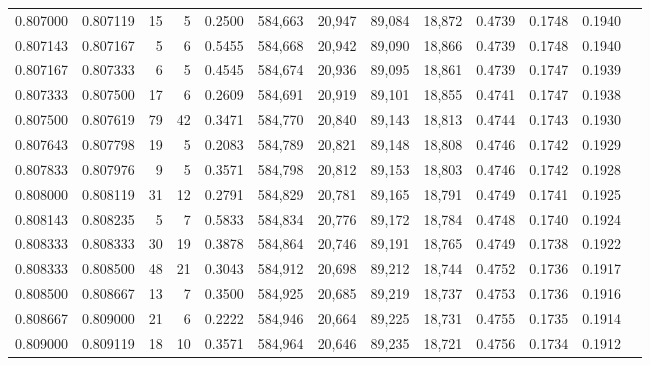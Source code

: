 \begin{tabular}{rrrrrrrrrrrrr}
0.807000 & 0.807119 &    15 &   5 &                                     0.2500 & 584,663 &  20,947 &  89,084 &  18,872 & 0.4739 & 0.1748 & 0.1940 \\
0.807143 & 0.807167 &     5 &   6 &                                     0.5455 & 584,668 &  20,942 &  89,090 &  18,866 & 0.4739 & 0.1748 & 0.1940 \\
0.807167 & 0.807333 &     6 &   5 &                                     0.4545 & 584,674 &  20,936 &  89,095 &  18,861 & 0.4739 & 0.1747 & 0.1939 \\
0.807333 & 0.807500 &    17 &   6 &                                     0.2609 & 584,691 &  20,919 &  89,101 &  18,855 & 0.4741 & 0.1747 & 0.1938 \\
0.807500 & 0.807619 &    79 &  42 &                                     0.3471 & 584,770 &  20,840 &  89,143 &  18,813 & 0.4744 & 0.1743 & 0.1930 \\
0.807643 & 0.807798 &    19 &   5 &                                     0.2083 & 584,789 &  20,821 &  89,148 &  18,808 & 0.4746 & 0.1742 & 0.1929 \\
0.807833 & 0.807976 &     9 &   5 &                                     0.3571 & 584,798 &  20,812 &  89,153 &  18,803 & 0.4746 & 0.1742 & 0.1928 \\
0.808000 & 0.808119 &    31 &  12 &                                     0.2791 & 584,829 &  20,781 &  89,165 &  18,791 & 0.4749 & 0.1741 & 0.1925 \\
0.808143 & 0.808235 &     5 &   7 &                                     0.5833 & 584,834 &  20,776 &  89,172 &  18,784 & 0.4748 & 0.1740 & 0.1924 \\
0.808333 & 0.808333 &    30 &  19 &                                     0.3878 & 584,864 &  20,746 &  89,191 &  18,765 & 0.4749 & 0.1738 & 0.1922 \\
0.808333 & 0.808500 &    48 &  21 &                                     0.3043 & 584,912 &  20,698 &  89,212 &  18,744 & 0.4752 & 0.1736 & 0.1917 \\
0.808500 & 0.808667 &    13 &   7 &                                     0.3500 & 584,925 &  20,685 &  89,219 &  18,737 & 0.4753 & 0.1736 & 0.1916 \\
0.808667 & 0.809000 &    21 &   6 &                                     0.2222 & 584,946 &  20,664 &  89,225 &  18,731 & 0.4755 & 0.1735 & 0.1914 \\
0.809000 & 0.809119 &    18 &  10 &                                     0.3571 & 584,964 &  20,646 &  89,235 &  18,721 & 0.4756 & 0.1734 & 0.1912 \\

\end{tabular}
